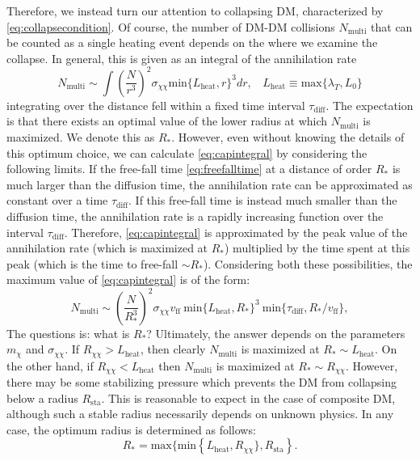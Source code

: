 \documentclass[preprintnumbers,amsmath,amssymb,prd,superscriptaddress]{revtex4}
\def\r{\right)}
\def\l{\left(}
\begin{document}
Therefore, we instead turn our attention to collapsing DM, characterized by \eqref{eq:collapsecondition}. 
Of course, the number of DM-DM collisions $N_\text{multi}$ that can be counted as a single heating event depends on the where we examine the collapse. 
In general, this is given as an integral of the annihilation rate
\begin{equation}
\label{eq:capintegral}
N_\text{multi} \sim \int \l \frac{N}{r^3}\r^2 \sigma_{\chi \chi} \text{min}\{L_\text{heat}, r\}^3 dr, ~~~~ L_\text{heat} \equiv \text{max}\{\lambda_T, L_0\}
\end{equation}
integrating over the distance fell within a fixed time interval $\tau_\text{diff}$. 
The expectation is that there exists an optimal value of the lower radius at which $N_\text{multi}$ is maximized.
We denote this as $R_*$. 
However, even without knowing the details of this optimum choice, we can calculate \eqref{eq:capintegral} by considering the following limits. 
If the free-fall time \eqref{eq:freefalltime} at a distance of order $R_*$ is much larger than the diffusion time, the annihilation rate can be approximated as constant over a time $\tau_\text{diff}$.
If this free-fall time is instead much smaller than the diffusion time, the annihilation rate is a rapidly increasing function over the interval $\tau_\text{diff}$.
Therefore, \eqref{eq:capintegral} is approximated by the peak value of the annihilation rate (which is maximized at $R_*$) multiplied by the time spent at this peak (which is the time to free-fall $\sim R_*$).
Considering both these possibilities, the maximum value of \eqref{eq:capintegral} is of the form: 
\begin{equation}
\label{eq:nmulti}
N_\text{multi} \sim \l \frac{N}{R_*^3}\r^2  \sigma_{\chi \chi} v_\text{ff} ~\text{min}\{L_\text{heat}, R_*\}^3 ~\text{min}\{\tau_\text{diff}, R_*/v_\text{ff}\},
\end{equation}
The questions is: what is $R_*$?
Ultimately, the answer depends on the parameters $m_\chi$ and $\sigma_{\chi \chi}$. 
If $R_{\chi \chi} > L_\text{heat}$, then clearly $N_\text{multi}$ is maximized at $R_* \sim L_\text{heat}$.
On the other hand, if $R_{\chi \chi} < L_\text{heat}$ then $N_\text{multi}$ is maximized at $R_* \sim R_{\chi \chi}$.
However, there may be some stabilizing pressure which prevents the DM from collapsing below a radius $R_\text{sta}$.
This is reasonable to expect in the case of composite DM, although such a stable radius necessarily depends on unknown physics. 
In any case, the optimum radius is determined as follows:
\begin{equation}
R_* = \text{max}\{\text{min}\left \{L_\text{heat}, R_{\chi \chi}\}, R_\text{sta}\right\}.
\end{equation}
\end{document}
